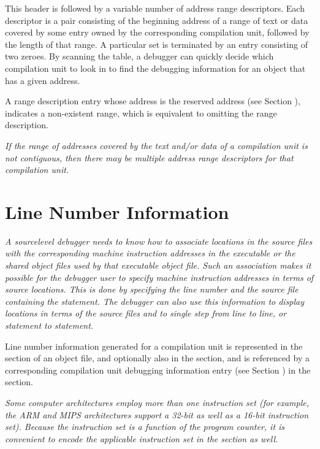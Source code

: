 This header is followed by a variable number of address range
descriptors. Each descriptor is a 
\bb
pair consisting of the beginning address
\eb 
of a range of text or data covered by some entry owned by
the corresponding compilation unit, followed by the 
\db
length of that range. A particular set is terminated by an
entry consisting of
\bb
two
\eb
zeroes.
\db 
By scanning the table, a debugger can quickly decide
which compilation unit to look in to find the debugging
information for an object that has a given address.

\bb
A range description entry whose address is the reserved address (see
Section ), indicates a 
non-existent range, which is equivalent to
omitting the range description.
\eb

\textit{If the range of addresses covered by the text and/or data
of a compilation unit is not contiguous, then there may be
multiple address range descriptors for that compilation unit.}


\section{Line Number Information}
\label{chap:linenumberinformation}
\textit{A source\dash level debugger needs to know how to
associate locations in the source files with the corresponding
machine instruction addresses in the executable or the shared 
object files used by that executable object file. Such an
association makes it possible for the debugger user
to specify machine instruction addresses in terms of source
locations. This is done by specifying the line number
and the source file containing the statement. The debugger
can also use this information to display locations in terms
of the source files and to single step from line to line,
or statement to statement.}

Line number information generated for a compilation unit is
represented in the 
\dotdebugline{} section of an object file, and optionally
also in the \dotdebuglinestr{} section, and
is referenced by a corresponding compilation unit debugging
information entry 
(see Section ) 
in the \dotdebuginfo{} section.

\textit{Some computer architectures employ more than one instruction
set (for example, the ARM 
and 
MIPS architectures support
a 32-bit as well as a 16-bit instruction set). Because the
instruction set is a function of the program counter, it is
convenient to encode the applicable instruction set in the
\dotdebugline{} section as well.}

